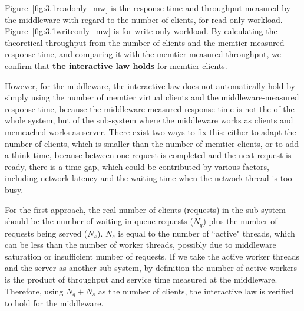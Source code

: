 \begin{figure}[!h]


\end{figure}

Figure~\ref{fig:3.1readonly_mw} is the response time and throughput measured by the middleware with regard to the number of clients, for read-only workload. Figure~\ref{fig:3.1writeonly_mw} is for write-only workload. By calculating the theoretical throughput from the number of clients and the memtier-measured response time, and comparing it with the memtier-measured throughput, we confirm that \textbf{the interactive law holds} for memtier clients. 

However, for the middleware, the interactive law does not automatically hold by simply using the number of memtier virtual clients and the middleware-measured response time, because the middleware-measured response time is not the of the whole system, but of the sub-system where the middleware works as clients and memcached works as server. There exist two ways to fix this: either to adapt the number of clients, which is smaller than the number of memtier clients, or to add a think time, because between one request is completed and the next request is ready, there is a time gap, which could be contributed by various factors, including network latency and the waiting time when the network thread is too busy. 

For the first approach, the real number of clients (requests) in the sub-system should be the number of waiting-in-queue requests ($N_q$) plus the number of requests being served ($N_s$). $N_s$ is equal to the number of ``active" threads, which can be less than the number of worker threads, possibly due to middleware saturation or insufficient number of requests. If we take the active worker threads and the server as another sub-system, by definition the number of active workers is the product of throughput and service time measured at the middleware. Therefore, using $N_q + N_s$ as the number of clients, the interactive law is verified to hold for the middleware.

